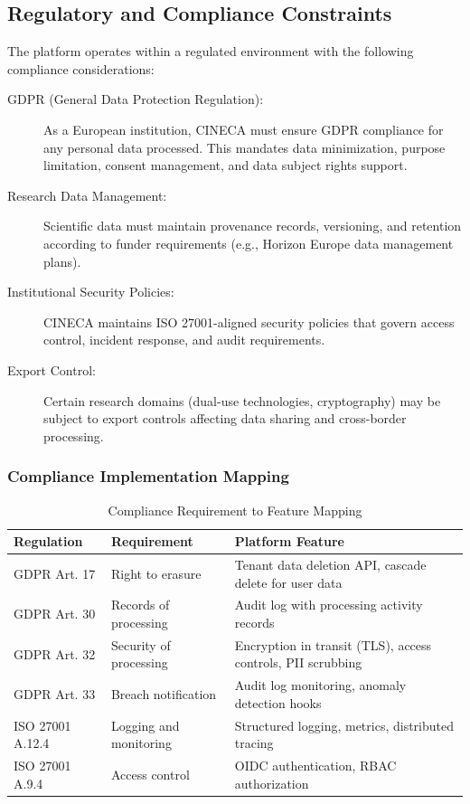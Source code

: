 \documentclass[a4paper,twoside]{sapthesis}
\begin{document}
\subsection{Regulatory and Compliance Constraints}
\label{subsec:compliance-constraints}

The platform operates within a regulated environment with the following compliance considerations:

\begin{description}
    \item[GDPR (General Data Protection Regulation):] As a European institution, CINECA must ensure GDPR compliance for any personal data processed. This mandates data minimization, purpose limitation, consent management, and data subject rights support.
    
    \item[Research Data Management:] Scientific data must maintain provenance records, versioning, and retention according to funder requirements (e.g., Horizon Europe data management plans).
    
    \item[Institutional Security Policies:] CINECA maintains ISO 27001-aligned security policies that govern access control, incident response, and audit requirements.
    
    \item[Export Control:] Certain research domains (dual-use technologies, cryptography) may be subject to export controls affecting data sharing and cross-border processing.
\end{description}

\subsubsection{Compliance Implementation Mapping}

\begin{table}[htbp]
\centering
\caption{Compliance Requirement to Feature Mapping}
\label{tab:compliance-mapping}
\small
\begin{tabular}{|l|l|p{6cm}|}
\hline
\textbf{Regulation} & \textbf{Requirement} & \textbf{Platform Feature} \\
\midrule
GDPR Art. 17 & Right to erasure & Tenant data deletion API, cascade delete for user data \\
\midrule
GDPR Art. 30 & Records of processing & Audit log with processing activity records \\
\midrule
GDPR Art. 32 & Security of processing & Encryption in transit (TLS), access controls, PII scrubbing \\
\midrule
GDPR Art. 33 & Breach notification & Audit log monitoring, anomaly detection hooks \\
\midrule
ISO 27001 A.12.4 & Logging and monitoring & Structured logging, metrics, distributed tracing \\
\midrule
ISO 27001 A.9.4 & Access control & OIDC authentication, RBAC authorization \\
\midrule
\end{tabular}
\end{table}
\end{document}
